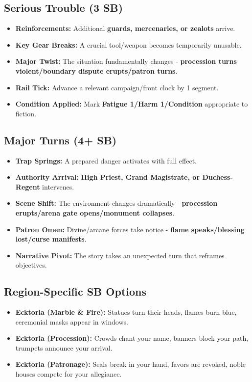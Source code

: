 \subsection*{Serious Trouble (3 SB)}
\begin{itemize}
\item \textbf{Reinforcements:} Additional \textbf{guards, mercenaries, or zealots} arrive.
\item \textbf{Key Gear Breaks:} A crucial tool/weapon becomes temporarily unusable.
\item \textbf{Major Twist:} The situation fundamentally changes - \textbf{procession turns violent/boundary dispute erupts/patron turns}.
\item \textbf{Rail Tick:} Advance a relevant campaign/front clock by 1 segment.
\item \textbf{Condition Applied:} Mark \textbf{Fatigue 1/Harm 1/Condition} appropriate to fiction.
\end{itemize}

\subsection*{Major Turns (4+ SB)}
\begin{itemize}
\item \textbf{Trap Springs:} A prepared danger activates with full effect.
\item \textbf{Authority Arrival:} \textbf{High Priest, Grand Magistrate, or Duchess-Regent} intervenes.
\item \textbf{Scene Shift:} The environment changes dramatically - \textbf{procession erupts/arena gate opens/monument collapses}.
\item \textbf{Patron Omen:} Divine/arcane forces take notice - \textbf{flame speaks/blessing lost/curse manifests}.
\item \textbf{Narrative Pivot:} The story takes an unexpected turn that reframes objectives.
\end{itemize}

\subsection*{Region-Specific SB Options}
\begin{itemize}
\item \textbf{Ecktoria (Marble \& Fire):} Statues turn their heads, flames burn blue, ceremonial masks appear in windows.
\item \textbf{Ecktoria (Procession):} Crowds chant your name, banners block your path, trumpets announce your arrival.
\item \textbf{Ecktoria (Patronage):} Seals break in your hand, favors are revoked, noble houses compete for your allegiance.
\end{itemize}


